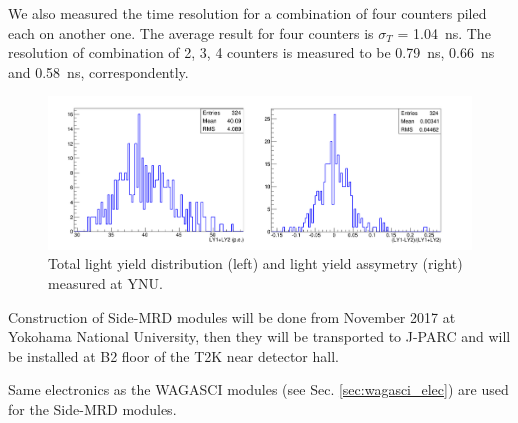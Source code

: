 We also measured the time resolution for a combination of four  counters piled each on another one.
The average result for four counters is  $\sigma_T$ = 1.04~ns. %
The resolution of combination of 2, 3, 4 counters is measured to be 0.79~ns, 0.66~ns and 0.58~ns, correspondently.
\begin{figure}[tbh]
\begin{center}
\includegraphics[width=0.8\linewidth]{fig/side_mrd_ly.pdf}
\end{center}
\caption{
Total light yield distribution (left) and light yield assymetry (right) measured at YNU.
}
\label{fig:side_mrd_ly}
\end{figure}

Construction of Side-MRD modules will be done from November 2017 at Yokohama National University, then they will be transported to J-PARC and will be installed at  B2 floor of the T2K near detector hall.%


Same electronics as the WAGASCI modules (see Sec. \ref{sec:wagasci_elec}) are used for the Side-MRD modules.
